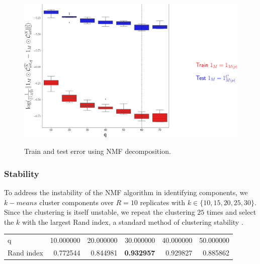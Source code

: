\begin{figure}[H]
    \centering
    \includegraphics[width = 5in]{figs/nmf_test_train.png} 
    \label{fig:train_test}
    \caption{Train and test error using NMF decomposition.}
\end{figure}

\newpage

\subsubsection{Stability}

To address the instability of the NMF algorithm in identifying components, we $k-means$ cluster components over $R = 10$ replicates with $k \in \{10,15,20, 25, 30\}$.
Since the clustering is itself unstable, we repeat the clustering $25$ times and select the $k$ with the largest Rand index, a standard method of clustering stability \citep{Rand1971-ny, Meila_2007}.

\begin{tabular}{lrrrrr}
\toprule
q          &  10.000000 &  20.000000 &  30.000000 &  40.000000 &  50.000000 \\
Rand index &   0.772544 &   0.844981 &   \textbf{0.932957} &   0.929827 &   0.885862 \\
\bottomrule
\end{tabular}

